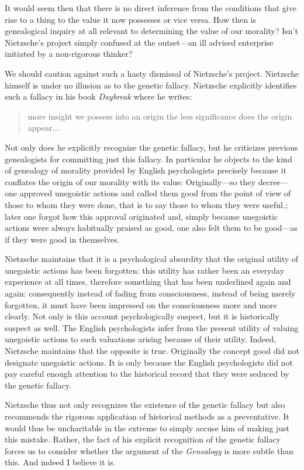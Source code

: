 It would seem then that there is no direct inference from the conditions that give rise to a thing to the value it now possesses or vice versa. How then is genealogical inquiry at all relevant to determining the value of our morality? Isn't Nietzsche's project simply confused at the outset---an ill advised enterprise initiated by a non-rigorous thinker?

We should caution against such a hasty dismissal of Nietzsche's project. Nietzsche himself is under no illusion as to the genetic fallacy. Nietzsche explicitly identifies such a fallacy in his book \emph{Daybreak} where he writes:
\begin{quote}
    more insight we possess into an origin the less significance does the origin appear... 
\end{quote}
Not only does he explicitly recognize the genetic fallacy, but he criticizes previous genealogists for committing just this fallacy. In particular he objects to the kind of genealogy of morality provided by English psychologists precisely because it conflates the origin of our morality with its value:
Originally---so they decree---one approved unegoistic actions and called them good from the point of view of those to whom they were done, that is to say those to whom they were useful.; later one forgot how this approval originated and, simply because unegoistic actions were always habitually praised as good, one also felt them to be good---as if they were good in themselves.

Nietzsche maintains that it is a psychological absurdity that the original utility of unegoistic actions has been forgotten: this utility has rather been an everyday experience at all times, therefore something that has been underlined again and again: consequently instead of fading from consciousness, instead of being merely forgotten, it must have been impressed on the consciousness more and more clearly. Not only is this account psychologically suspect, but it is historically suspect as well. The English psychologists infer from the present utility of valuing unegoistic actions to such valuations arising because of their utility. Indeed, Nietzsche maintains that the opposite is true. Originally the concept good did not designate unegoistic actions. It is only because the English psychologists did not pay careful enough attention to the historical record that they were seduced by the genetic fallacy.

Nietzsche thus not only recognizes the existence of the genetic fallacy but also recommends the rigorous application of historical methods as a preventative. It would thus be uncharitable in the extreme to simply accuse him of making just this mistake. Rather, the fact of his explicit recognition of the genetic fallacy forces us to consider whether the argument of the \emph{Genealogy} is more subtle than this. And indeed I believe it is.

